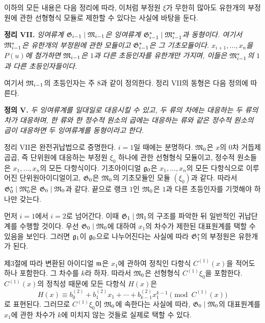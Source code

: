 이하의 모든 내용은 다음 정리에 따라, 이처럼 부정원 \(\xi\)가 무한히 많아도 유한개의 부정원에 관한 선형형식 모듈로 제한할 수 있다는 사실에 바탕을 둔다.

\medskip
\noindent\textbf{정리 VII.} \emph{잉여류계 \(\mathfrak G_{i-1}\mid\mathfrak M_{i-1}\)은 잉여류계 \(\mathfrak G^*_{i-1}\mid\mathfrak M^*_{i-1}\)과 동형이다. 여기서 \(\mathfrak M^*_{i-1}\)은 유한개의 부정원에 관한 모듈이고 \(\mathfrak G^*_{i-1}\)은 그 기초모듈이다. \(x_{i+1},\ldots,x_n\)을 \(P(u)\)에 첨가하면 \(\mathfrak M_{i-1}\)은 \(1\)과 다른 초등인자를 유한개만 가지며, 이들은 \(\mathfrak M^*_{i-1}\)의 \(1\)과 다른 초등인자들이다.}

여기서 \(\mathfrak M_{i-1}\)의 초등인자는 주 8과 같이 정의한다. 정리 VII의 동형은 다음 정의에 따른다.

\medskip
\noindent\textbf{정의 V.} \emph{두 잉여류계를 일대일로 대응시킬 수 있고, 두 류의 차에는 대응하는 두 류의 차가 대응하며, 한 류와 한 정수적 원소의 곱에는 대응하는 류와 같은 정수적 원소의 곱이 대응하면 두 잉여류계를 동형이라고 한다.}

정리 VII은 완전귀납법으로 증명한다. \(i=1\)일 때에는 분명하다. \(\mathfrak M_0\)은 \(x\)의 0차 거듭제곱곱, 즉 단위원에 대응하는 부정원 \(\xi_0\) 하나에 관한 선형형식 모듈이고, 정수적 원소들은 \(x_1,\ldots,x_n\)의 모든 다항식이다. 기초아이디얼 \(\mathfrak g_0\)은 \(x_1,\ldots,x_n\)의 모든 다항식으로 이루어진 단위원아이디얼이고, \(\mathfrak G_0\)은 \(\mathfrak M_0\)의 기초모듈인 모듈 \((\xi_0)\)과 같다. 따라서 \(\mathfrak G^*_0\mid\mathfrak M^*_0\)은 \(\mathfrak G_0\mid\mathfrak M_0\)과 같다. 끝으로 랭크 \(1\)인 \(\mathfrak M_0\)은 \(1\)과 다른 초등인자를 기껏해야 하나만 갖는다.

먼저 \(i=1\)에서 \(i=2\)로 넘어간다. 이때 \(\mathfrak G_1\mid\mathfrak M_1\)의 구조를 파악한 뒤 일반적인 귀납단계를 수행할 것이다. 우선 \(\mathfrak G_0\mid\mathfrak M_0\)에 대하여 \(x_1\)의 차수가 제한된 대표원계를 택할 수 있음을 보인다. 그러면 \(\mathfrak g_1\)이 \(\mathfrak g_0\)으로 나누어진다는 사실에 따라 \(\mathfrak G^*_1\)의 부정원은 유한개가 된다.

제3절에 따라 변환된 아이디얼 \(\mathfrak m\)은 \(x_1\)에 관하여 정칙인 다항식 \(C^{(1)}(x)\)을 적어도 하나 포함한다. 그 차수를 \(k\)라 하자. 따라서 \(\mathfrak M_0\)은 선형형식 \(C^{(1)}\xi_0\)을 포함한다. \(C^{(1)}(x)\)의 정칙성 때문에 모든 다항식 \(H(x)\)은
\begin{equation}
H(x)\equiv b_0^{(2)}+b_1^{(2)}x_1+\cdots+
b_{k-1}^{(2)}x_1^{k-1}
\pmod{C^{(1)}(x)}
\tag{21}
\end{equation}
로 표현된다. 그러므로 \(C^{(1)}\xi_0\)이 \(\mathfrak M_0\)에 속한다는 사실에 따라, \(\mathfrak G_0\mid\mathfrak M_0\)의 대표원계를 \(x_1\)에 관한 차수가 \(k\)에 미치지 않는 것들로 실제로 택할 수 있다.

